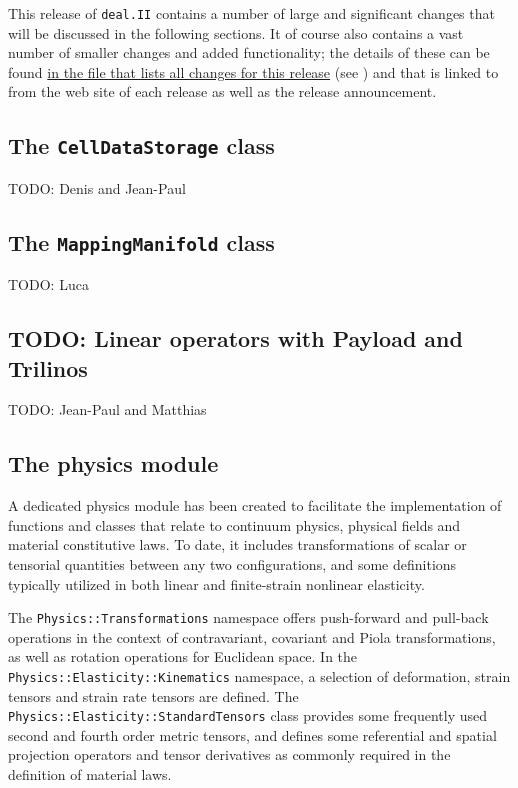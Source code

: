 \documentclass{ansarticle-preprint}
\newcommand{\specialword}[1]{\texttt{#1}}
\newcommand{\dealii}{{\specialword{deal.II}}}
\begin{document}
This release of \dealii{} contains a number of large and significant changes
that will be discussed in the following sections. It of course also contains a
vast number of smaller changes and added functionality; the details of these
can be found
\href{https://www.dealii.org/8.5.0/doxygen/deal.II/changes_between_8_4_and_8_5.html}{in the file that lists all changes for this release} (see \cite{changes84})
and that is linked to from the web site of each release as well as the
release announcement.


\subsection{The \texttt{CellDataStorage} class}

TODO: Denis and Jean-Paul

\subsection{The \texttt{MappingManifold} class}

TODO: Luca

\subsection{TODO: Linear operators with Payload and Trilinos}

TODO: Jean-Paul and Matthias

\subsection{The physics module}

A dedicated physics module has been created to facilitate the implementation of functions and classes that relate to continuum physics, physical fields and material constitutive laws.
To date, it includes transformations of scalar or tensorial quantities between any two configurations, and some definitions typically utilized in both linear and finite-strain nonlinear elasticity.

The \verb!Physics::Transformations! namespace offers push-forward and pull-back operations in the context of contravariant, covariant and Piola transformations, as well as rotation operations for Euclidean space.
In the \verb!Physics::Elasticity::Kinematics! namespace, a selection of deformation, strain tensors and strain rate tensors are defined.
The \verb!Physics::Elasticity::StandardTensors! class provides some frequently used second and fourth order metric tensors, and defines some referential and spatial projection operators and tensor derivatives as commonly required in the definition of material laws.
\end{document}
